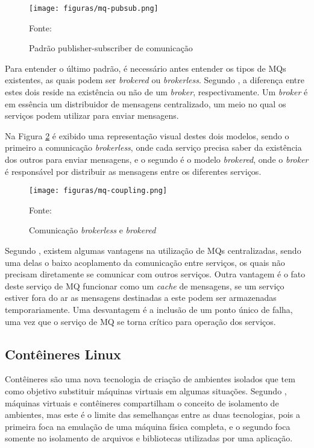 \begin{figure}[H]
	\centering
	\caption{Padrão publisher-subscriber de comunicação}
	\texttt{[image: figuras/mq-pubsub.png]}

	\label{fig:mq-pubsub}
	\footnotesize Fonte: 
\end{figure}

Para entender o último padrão, é necessário antes entender os tipos de \acp{MQ}
existentes, as quais podem ser \emph{brokered} ou \emph{brokerless}. Segundo
, a diferença entre estes dois reside na existência
ou não de um \emph{broker}, respectivamente. Um \emph{broker} é em essência um
distribuidor de mensagens centralizado, um meio no qual os serviços podem
utilizar para enviar mensagens.

Na Figura \ref{fig:mq-coupling} é exibido uma representação visual destes dois
modelos, sendo o primeiro a comunicação \emph{brokerless}, onde cada serviço
precisa saber da existência dos outros para enviar mensagens, e o segundo é
o modelo \emph{brokered}, onde o \emph{broker} é responsável por distribuir
as mensagens entre os diferentes serviços.

\begin{figure}[H]
	\centering
	\caption{Comunicação \emph{brokerless} e \emph{brokered}}
	\texttt{[image: figuras/mq-coupling.png]}

	\label{fig:mq-coupling}
	\footnotesize Fonte: 
\end{figure}

Segundo , existem algumas vantagens na utilização
de \acp{MQ} centralizadas, sendo uma delas o baixo acoplamento da comunicação
entre serviços, os quais não precisam diretamente se comunicar com outros
serviços. Outra vantagem é o fato deste serviço de \ac{MQ} funcionar como
um \emph{cache} de mensagens, se um serviço estiver fora do ar as
mensagens destinadas a este podem ser armazenadas temporariamente. Uma
desvantagem é a inclusão de um ponto único de falha, uma vez que o serviço
de \ac{MQ} se torna crítico para operação dos serviços.

\subsection{Contêineres Linux}

Contêineres são uma nova tecnologia de criação de ambientes isolados que tem
como objetivo substituir máquinas virtuais em algumas situações. Segundo
, máquinas virtuais e contêineres compartilham o
conceito de isolamento de ambientes, mas este é o limite das semelhanças
entre as duas tecnologias, pois a primeira foca na emulação de uma máquina
física completa, e o segundo foca somente no isolamento de arquivos e
bibliotecas utilizadas por uma aplicação.

